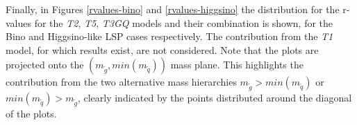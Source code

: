 \documentclass[preprint,number,sort&compress,twocolumn,3p]{elsstyarticle}
\begin{document}
Finally, in Figures \ref{rvalues-bino} and \ref{rvalues-higgsino} the distribution for the r-values for the \textit{T2}, \textit{T5}, \textit{T3GQ} models and their combination is shown, for the Bino and Higgsino-like LSP cases respectively. The contribution from the \textit{T1} model, for which results exist, are not considered. Note that the plots are projected onto the $(m_{\tilde g}, min(m_{\tilde q}))$ mass plane. This highlights the contribution from the two alternative mass hierarchies $m_{\tilde g} > min(m_{\tilde q})$ or $min(m_{\tilde q}) > m_{\tilde g} $, clearly indicated by the points distributed around the diagonal of the plots. 
\\

%
\end{document}
